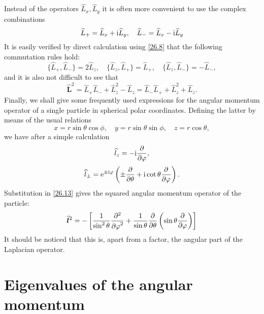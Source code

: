 Instead of the operators $ \hat{L}_x,\hat{L}_y $ it is often more convenient to use the complex combinations
\begin{equation}\label{26.11}
\widehat{L}_{+}=\widehat{L}_x+\mathrm{i}\widehat{L}_y,\quad\widehat{L}_{-}=\widehat{L}_x-\mathrm{i}\widehat{L}_y
\end{equation}
It is easily verified by direct calculation using \eqref{26.8} that the following commutation rules hold:
\begin{equation}\label{26.12}
\{\hat{L}_{+},\hat{L}_{-}  \}=2\hat{L}_z,\quad\{\hat{L}_z,\hat{L}_{+} \}=\hat{L}_{+},\quad\{ 
\hat{L}_z,\hat{L}_{-} \}=-\hat{L}_{-},
\end{equation}
and it is also not difficult to see that
\begin{equation}\label{26.13}
\hat{\bm{L}}^2=\hat{L}_{+}\hat{L}_{-}+\hat{L}_z^2-\hat{L}_z=\hat{L}_{-}\hat{L}_{+}+\hat{L}_z^2+\hat{L}_z.
\end{equation}
Finally, we shall give some frequently used expressions for the angular momentum operator of a single particle in spherical polar coordinates. Defining the latter by means of the usual relations
\[ x=r\sin\theta\cos\phi,\quad y=r\sin\theta\sin\phi,\quad z=r\cos\theta, \]
we have after a simple calculation
\begin{equation}\label{26.14}
\widehat{l}_z=-\mathrm{i}\frac{\partial}{\partial \varphi},
\end{equation}
\begin{equation}\label{26.15}
\widehat{l}_{\pm}=\mathrm{e}^{\pm\mathrm{i}\varphi}\left(\pm\frac{\partial}{\partial\theta}+\mathrm{i}\cot\theta\frac{\partial}{\partial\varphi} \right).
\end{equation}
Substitution in \eqref{26.13} gives the squared angular momentum operator of the particle:
\begin{equation}\label{26.16}
\widehat{\bm{l}}^2=-\left[\frac{1}{\sin^2\theta}\frac{\partial^2}{{\partial\varphi}^2}+\frac{1}{\sin\theta}\frac{\partial}{\partial\theta}\left(\sin\theta\frac{\partial}{\partial\varphi} \right) \right]
\end{equation}
It should be noticed that this is, apart from a factor, the angular part of the Laplacian operator.





\section{Eigenvalues of the angular momentum}\label{Eigenvalues of the angular momentum}


